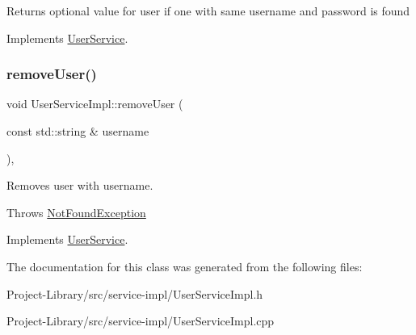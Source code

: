 Returns optional value for user if one with same username and password is found 

Implements \hyperlink{classUserService_ae98e5e71adb53af6fdafb270a766f512}{User\+Service}.

\mbox{\label{classUserServiceImpl_a3549c348a3c24d4b0519339c0123460d}} 
\subsubsection{\texorpdfstring{remove\+User()}{removeUser()}}
{\footnotesize\ttfamily void User\+Service\+Impl\+::remove\+User (\begin{DoxyParamCaption}\item[{const std\+::string \&}]{username }\end{DoxyParamCaption})\hspace{0.3cm}{\ttfamily [override]}, {\ttfamily [virtual]}}

Removes user with username.

Throws \hyperlink{classNotFoundException}{Not\+Found\+Exception} 

Implements \hyperlink{classUserService_aab158c8d9ed5c8cf7d62b762d62ea9b4}{User\+Service}.



The documentation for this class was generated from the following files\+:\begin{DoxyCompactItemize}
\item 
Project-\/\+Library/src/service-\/impl/User\+Service\+Impl.\+h\item 
Project-\/\+Library/src/service-\/impl/User\+Service\+Impl.\+cpp\end{DoxyCompactItemize}
